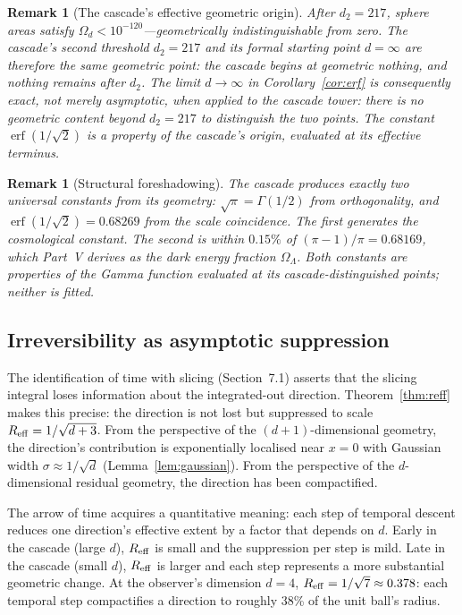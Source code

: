 \documentclass[12pt,a4paper]{article}
\newtheorem{remark}[theorem]{Remark}
\begin{document}
\begin{remark}[The cascade's effective geometric origin]
After $d_2 = 217$, sphere areas satisfy $\Omega_d < 10^{-120}$---geometrically
indistinguishable from zero. The cascade's second threshold $d_2 = 217$ and its formal
starting point $d = \infty$ are therefore the same geometric point: the cascade begins at
geometric nothing, and nothing remains after $d_2$. The limit $d\to\infty$ in
Corollary~\ref{cor:erf} is consequently exact, not merely asymptotic, when applied to the
cascade tower: there is no geometric content beyond $d_2 = 217$ to distinguish the two
points. The constant $\operatorname{erf}(1/\sqrt{2})$ is a property of the cascade's
origin, evaluated at its effective terminus.
\end{remark}

\begin{remark}[Structural foreshadowing]
The cascade produces exactly two universal constants from its geometry:
$\sqrt{\pi} = \Gamma(1/2)$ from orthogonality, and $\operatorname{erf}(1/\sqrt{2}) =
0.68269$ from the scale coincidence. The first generates the cosmological constant.
The second is within $0.15\%$ of $(\pi-1)/\pi = 0.68169$, which Part~V derives as the
dark energy fraction $\Omega_\Lambda$. Both constants are properties of the
Gamma function evaluated at its cascade-distinguished points; neither is fitted.
\end{remark}

\subsection{Irreversibility as asymptotic suppression}

The identification of time with slicing (Section~7.1) asserts that the slicing integral
loses information about the integrated-out direction. Theorem~\ref{thm:reff} makes this
precise: the direction is not lost but suppressed to scale $R_{\rm eff}=1/\sqrt{d+3}$.
From the perspective of the $(d+1)$-dimensional geometry, the direction's contribution is
exponentially localised near $x=0$ with Gaussian width $\sigma\approx 1/\sqrt{d}$
(Lemma~\ref{lem:gaussian}). From the perspective of the $d$-dimensional residual geometry,
the direction has been compactified.

The arrow of time acquires a quantitative meaning: each step of temporal descent reduces one
direction's effective extent by a factor that depends on $d$. Early in the cascade (large
$d$), $R_{\rm eff}$ is small and the suppression per step is mild. Late in the cascade
(small $d$), $R_{\rm eff}$ is larger and each step represents a more substantial geometric
change. At the observer's dimension $d=4$, $R_{\rm eff}=1/\sqrt{7}\approx 0.378$: each
temporal step compactifies a direction to roughly 38\% of the unit ball's radius.
\end{document}
